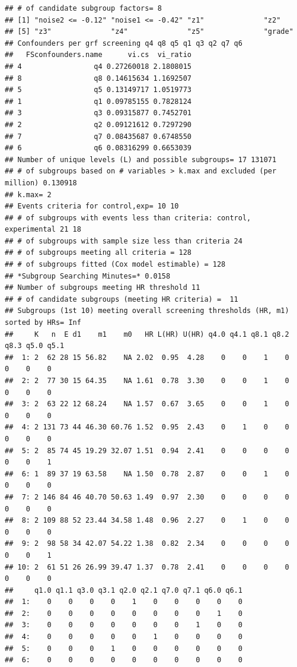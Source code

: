 \documentclass[smallextended]{svjour3}
\makeatletter
\newenvironment{kframe}{%
 \def\at@end@of@kframe{}%
 \ifinner\ifhmode%
  \def\at@end@of@kframe{\end{minipage}}%
  \begin{minipage}{\columnwidth}%
 \fi\fi%
 \def\FrameCommand##1{\hskip\@totalleftmargin \hskip-\fboxsep
 \colorbox{shadecolor}{##1}\hskip-\fboxsep
     \hskip-\linewidth \hskip-\@totalleftmargin \hskip\columnwidth}%
 \MakeFramed {\advance\hsize-\width
   \@totalleftmargin\z@ \linewidth\hsize
   \@setminipage}}%
 {\par\unskip\endMakeFramed%
 \at@end@of@kframe}
\newenvironment{knitrout}{}{} %
\makeatother
\begin{document}
\begin{knitrout}
\begin{kframe}
\begin{verbatim}
## # of candidate subgroup factors= 8 
## [1] "noise2 <= -0.12" "noise1 <= -0.42" "z1"              "z2"             
## [5] "z3"              "z4"              "z5"              "grade"          
## Confounders per grf screening q4 q8 q5 q1 q3 q2 q7 q6 
##   FSconfounders.name      vi.cs  vi_ratio
## 4                 q4 0.27260018 2.1808015
## 8                 q8 0.14615634 1.1692507
## 5                 q5 0.13149717 1.0519773
## 1                 q1 0.09785155 0.7828124
## 3                 q3 0.09315877 0.7452701
## 2                 q2 0.09121612 0.7297290
## 7                 q7 0.08435687 0.6748550
## 6                 q6 0.08316299 0.6653039
## Number of unique levels (L) and possible subgroups= 17 131071 
## # of subgroups based on # variables > k.max and excluded (per million) 0.130918 
## k.max= 2 
## Events criteria for control,exp= 10 10 
## # of subgroups with events less than criteria: control, experimental 21 18 
## # of subgroups with sample size less than criteria 24 
## # of subgroups meeting all criteria = 128 
## # of subgroups fitted (Cox model estimable) = 128 
## *Subgroup Searching Minutes=* 0.0158 
## Number of subgroups meeting HR threshold 11 
## # of candidate subgroups (meeting HR criteria) =  11 
## Subgroups (1st 10) meeting overall screening thresholds (HR, m1) sorted by HRs= Inf 
##     K   n  E d1    m1    m0   HR L(HR) U(HR) q4.0 q4.1 q8.1 q8.2 q8.3 q5.0 q5.1
##  1: 2  62 28 15 56.82    NA 2.02  0.95  4.28    0    0    1    0    0    0    0
##  2: 2  77 30 15 64.35    NA 1.61  0.78  3.30    0    0    1    0    0    0    0
##  3: 2  63 22 12 68.24    NA 1.57  0.67  3.65    0    0    1    0    0    0    0
##  4: 2 131 73 44 46.30 60.76 1.52  0.95  2.43    0    1    0    0    0    0    0
##  5: 2  85 74 45 19.29 32.07 1.51  0.94  2.41    0    0    0    0    0    0    1
##  6: 1  89 37 19 63.58    NA 1.50  0.78  2.87    0    0    1    0    0    0    0
##  7: 2 146 84 46 40.70 50.63 1.49  0.97  2.30    0    0    0    0    0    0    0
##  8: 2 109 88 52 23.44 34.58 1.48  0.96  2.27    0    1    0    0    0    0    0
##  9: 2  98 58 34 42.07 54.22 1.38  0.82  2.34    0    0    0    0    0    0    1
## 10: 2  61 51 26 26.99 39.47 1.37  0.78  2.41    0    0    0    0    0    0    0
##     q1.0 q1.1 q3.0 q3.1 q2.0 q2.1 q7.0 q7.1 q6.0 q6.1
##  1:    0    0    0    0    1    0    0    0    0    0
##  2:    0    0    0    0    0    0    0    0    1    0
##  3:    0    0    0    0    0    0    0    1    0    0
##  4:    0    0    0    0    0    1    0    0    0    0
##  5:    0    0    0    1    0    0    0    0    0    0
##  6:    0    0    0    0    0    0    0    0    0    0

\end{verbatim}
\end{kframe}
\end{knitrout}
\end{document}
